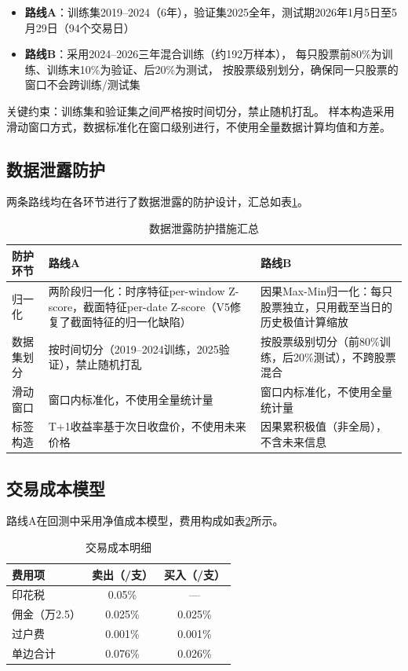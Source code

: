 \documentclass[12pt,a4paper]{ctexart}
\begin{document}
\begin{itemize}[leftmargin=*]
    \item \textbf{路线A}：训练集2019--2024（6年），验证集2025全年，测试期2026年1月5日至5月29日（94个交易日）
    \item \textbf{路线B}：采用2024--2026三年混合训练（约192万样本），
          每只股票前80\%为训练、训练末10\%为验证、后20\%为测试，
          按股票级别划分，确保同一只股票的窗口不会跨训练/测试集
\end{itemize}

关键约束：训练集和验证集之间严格按时间切分，禁止随机打乱。
样本构造采用滑动窗口方式，数据标准化在窗口级别进行，不使用全量数据计算均值和方差。

\subsection{数据泄露防护}

两条路线均在各环节进行了数据泄露的防护设计，汇总如表\ref{tab:leak_prevention}。

\begin{table}[htbp]
\centering
\caption{数据泄露防护措施汇总}
\label{tab:leak_prevention}
\begin{tabular}{lp{5cm}p{5cm}}
\toprule
防护环节 & 路线A & 路线B \\
\midrule
归一化 & 两阶段归一化：时序特征per-window Z-score，截面特征per-date Z-score（V5修复了截面特征的归一化缺陷） & 因果Max-Min归一化：每只股票独立，只用截至当日的历史极值计算缩放 \\
数据集划分 & 按时间切分（2019--2024训练，2025验证），禁止随机打乱 & 按股票级别切分（前80\%训练，后20\%测试），不跨股票混合 \\
滑动窗口 & 窗口内标准化，不使用全量统计量 & 窗口内标准化，不使用全量统计量 \\
标签构造 & T+1收益率基于次日收盘价，不使用未来价格 & 因果累积极值（非全局），不含未来信息 \\
\bottomrule
\end{tabular}
\end{table}

\subsection{交易成本模型}

路线A在回测中采用净值成本模型，费用构成如表\ref{tab:cost_model}所示。

\begin{table}[htbp]
\centering
\caption{交易成本明细}
\label{tab:cost_model}
\begin{tabular}{lcc}
\toprule
费用项 & 卖出（/支） & 买入（/支） \\
\midrule
印花税 & 0.05\% & — \\
佣金（万2.5） & 0.025\% & 0.025\% \\
过户费 & 0.001\% & 0.001\% \\
\midrule
单边合计 & 0.076\% & 0.026\% \\
\bottomrule
\end{tabular}
\end{table}
\end{document}
